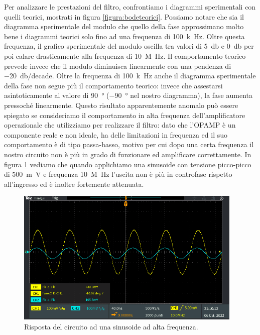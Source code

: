 \documentclass{report}
\begin{document}
Per analizzare le prestazioni del filtro, confrontiamo i diagrammi sperimentali con quelli teorici, mostrati in figura \ref{figura:bodeteorici}. Possiamo notare che sia il diagramma sperimentale del modulo che quello della fase approssimano molto bene i diagrammi teorici solo fino ad una frequenza di \SI{100}{k\hertz}. Oltre questa frequenza, il grafico sperimentale del modulo oscilla tra valori di \SI{5}{\decibel} e \SI{0}{\decibel} per poi calare drasticamente alla frequenza di \SI {10}{M\hertz}. Il comportamento teorico prevede invece che il modulo diminuisca linearmente con una pendenza di \SI{-20}{\decibel}/decade. Oltre la frequenza di \SI{100}{k\hertz} anche il diagramma sperimentale della fase non segue più il comportamento teorico: invece che assestarsi asintoticamente al valore di \SI{90}{\degree} (\SI{-90}{\degree} nel nostro diagramma), la fase aumenta pressoché linearmente. Questo risultato apparentemente anomalo può essere spiegato se consideriamo il comportamento in alta frequenza dell'amplificatore operazionale che utilizziamo per realizzare il filtro: dato che l'OPAMP è un componente reale e non ideale, ha delle limitazioni in frequenza ed il suo comportamento è di tipo passa-basso, motivo per cui dopo una certa frequenza il nostro circuito non è più in grado di funzionare ed amplificare correttamente. In figura \ref{figura:TEK13} vediamo che quando applichiamo una sinusoide con tensione picco-picco di \SI{500}{m\volt} e frequenza \SI{10}{M\hertz} l'uscita non è più in controfase rispetto all'ingresso ed è inoltre fortemente attenuata.
\begin{figure}[h!]
	\centering
	\includegraphics[height=6.5cm]{immagini/TEK00013}
	\caption{Risposta del circuito ad una sinusoide ad alta frequenza.}
	\label{figura:TEK13}
\end{figure}
\end{document}
